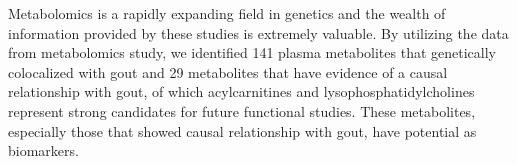 \documentclass[a4paper,10pt]{article}
\newcommand{\beginsupplement}{
	\setcounter{supptable}{0}
	\renewcommand{\thesupptable}{{S\arabic{supptable}}}
	\setcounter{suppfigure}{0}
	\renewcommand{\thesuppfigure}{{S\arabic{suppfigure}}}
}
\begin{document}
Metabolomics is a rapidly expanding field in genetics and the wealth of information provided by these studies is extremely valuable.
By utilizing the data from metabolomics study, we identified 141 plasma metabolites that genetically colocalized with gout and 29 metabolites that have evidence of a causal relationship with gout, of which acylcarnitines and lysophosphatidylcholines represent strong candidates for future functional studies.
These metabolites, especially those that showed causal relationship with gout, have potential as biomarkers.
\\



% 







\end{document}
